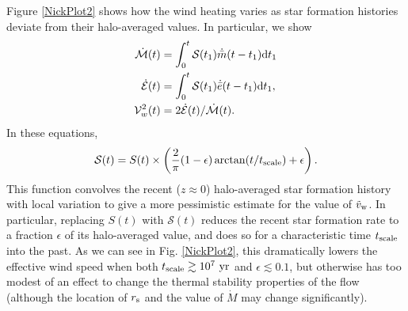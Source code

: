Figure \ref{NickPlot2} shows how the wind heating varies as star formation histories deviate from their halo-averaged values.  In particular, we show
\begin{align} 
  \dot{\mathcal{M}}(t) &= \int_0^t \mathcal{S}(t_1) \dot{\bar{m}}(t-t_1){\rm
      d}t_1\\
  \dot{\mathcal{E}}(t) &= \int_0^t \mathcal{S}(t_1) \dot{\bar{e}}(t-t_1){\rm
      d}t_1,\\
  \mathcal{V}_w^2(t) &=2 \dot{\mathcal{E}}(t)/\dot{\mathcal{M}}(t).
\end{align}
In these equations, 
\begin{equation}
\mathcal{S}(t) = S(t) \times \left(\frac{2}{\pi}(1-\epsilon)\arctan(t/t_{\rm scale}) + \epsilon \right).
\end{equation}
This function convolves the recent ($z \approx 0$) halo-averaged star formation history with local variation to give a more pessimistic estimate for the value of $\tilde{v}_{\rm w}$.  In particular, replacing $S(t)$ with $\mathcal{S}(t)$ reduces the recent star formation rate to a fraction $\epsilon$ of its halo-averaged value, and does so for a characteristic time $t_{\rm scale}$ into the past.  As we can see in Fig. \ref{NickPlot2}, this dramatically lowers the effective wind speed when both $t_{\rm scale} \gtrsim 10^7 ~{\rm yr}$ and $\epsilon \lesssim 0.1$, but otherwise has too modest of an effect to change the thermal stability properties of the flow (although the location of $r_{\rm s}$ and the value of $\dot{M}$ may change significantly).



